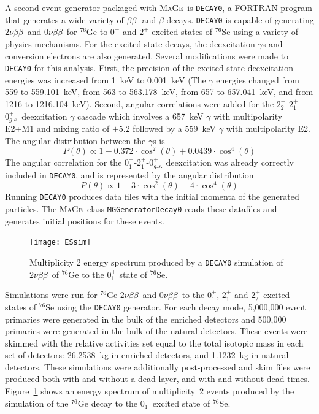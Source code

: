 \documentclass[notitlepage,rmp,aps,10pt]{revtex4-1}
\newcommand{\znbb}{${0 \nu \beta \beta}$}
\newcommand{\tnbb}{${2 \nu \beta \beta}$}
\newcommand{\Mage}{\textsc{MaGe}}
\newcommand{\iso}[2]{$^{#1}$#2}
\newcommand{\Ge}[1]{\iso{#1}{Ge}}
\newcommand{\Se}[1]{\iso{#1}{Se}}
\newcommand{\SP}[3]{$#1^{#2}_{#3}$}
\begin{document}
A second event generator packaged with \Mage\ is \texttt{DECAY0}\cite{Ponkratenko2000}, a FORTRAN program that generates a wide variety of $\beta\beta$- and $\beta$-decays.
\texttt{DECAY0} is capable of generating \tnbb\ and \znbb\ for \Ge{76} to \SP{0}{+}{} and \SP{2}{+}{} excited states of \Se{76} using a variety of physics mechanisms.
For the excited state decays, the deexcitation $\gamma$s and conversion electrons are also generated.
Several modifications were made to \texttt{DECAY0} for this analysis.
First, the precision of the excited state deexcitation energies was increased from 1~keV to 0.001~keV (The $\gamma$ energies changed from 559 to 559.101~keV, from 563 to 563.178~keV, from 657 to 657.041~keV, and from 1216 to 1216.104~keV).
Second, angular correlations were added for the \SP{2}{+}{2}-\SP{2}{+}{1}-\SP{0}{+}{g.s.} deexcitation $\gamma$ cascade which involves a 657~keV $\gamma$ with multipolarity E2+M1 and mixing ratio of $+5.2$ followed by a 559~keV $\gamma$ with multipolarity E2\cite{SINGH1995}.
The angular distribution between the $\gamma$s is\cite{Evans1955} 
\begin{equation}
  P(\theta)\propto 1-0.372\cdot\cos^2(\theta)+0.0439\cdot\cos^4(\theta)
\end{equation}
The angular correlation for the \SP{0}{+}{1}-\SP{2}{+}{1}-\SP{0}{+}{g.s.} deexcitation was already correctly included in \texttt{DECAY0}, and is represented by the angular distribution\cite{SINGH1995, Evans1955}
\begin{equation}
  P(\theta)\propto 1-3\cdot\cos^2(\theta)+4\cdot\cos^4(\theta)
\end{equation}
Running \texttt{DECAY0} produces data files with the initial momenta of the generated particles.
The \Mage\ class \texttt{MGGeneratorDecay0} reads these datafiles and generates initial positions for these events.

\begin{figure}[h]
  \centering
  \texttt{[image: ESsim]}
  \caption[Simulation of multiplicty 2 events from \tnbb\ to \SP{0}{+}{1}]{\label{fig:2dessim}
    Multiplicity 2 energy spectrum produced by a \texttt{DECAY0} simulation of \tnbb\ of \Ge{76} to the \SP{0}{+}{1} state of \Se{76}.
  }
\end{figure}
Simulations were run for \Ge{76} \tnbb\ and \znbb\ to the \SP{0}{+}{1}, \SP{2}{+}{1} and \SP{2}{+}{2} excited states of \Se{76} using the \texttt{DECAY0} generator.
For each decay mode, 5,000,000 event primaries were generated in the bulk of the enriched detectors and 500,000 primaries were generated in the bulk of the natural detectors.
These events were skimmed with the relative activities set equal to the total isotopic mass in each set of detectors: 26.2538~kg in enriched detectors, and 1.1232~kg in natural detectors.
These simulations were additionally post-processed and skim files were produced both with and without a dead layer, and with and without dead times.
Figure~\ref{fig:2dessim} shows an energy spectrum of multiplicity~2 events produced by the simulation of the \Ge{76} decay to the \SP{0}{+}{1} excited state of \Se{76}.
\end{document}
